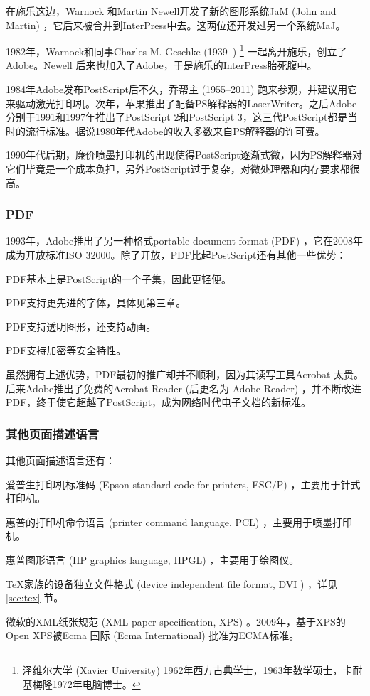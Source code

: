 在施乐这边，Warnock 和Martin Newell\indexNewell 开发了新的图形系统JaM (John and Martin) ，它后来被合并到InterPress中去。这两位还开发过另一个系统MaJ。

1982年，Warnock和同事Charles M. Geschke (1939--)\indexGeschke{} \footnote{泽维尔大学 (Xavier University) 1962年西方古典学士，1963年数学硕士，卡耐基梅隆1972年电脑博士。} 一起离开施乐，创立了Adobe\indexAdobe{}。Newell 后来也加入了Adobe，于是施乐的InterPress胎死腹中。

1984年Adobe发布PostScript后不久，乔帮主 (1955--2011)\indexJobs{} 跑来参观，并建议用它来驱动激光打印机。次年，苹果推出了配备PS解释器的LaserWriter。之后Adobe分别于1991和1997年推出了PostScript 2和PostScript 3，这三代PostScript都是当时的流行标准。据说1980年代Adobe的收入多数来自PS解释器的许可费。

1990年代后期，廉价喷墨打印机的出现使得PostScript逐渐式微，因为PS解释器对它们毕竟是一个成本负担，另外PostScript过于复杂，对微处理器和内存要求都很高。

\subsubsection{PDF}
1993年，Adobe推出了另一种格式portable document format (PDF) ，它在2008年成为开放标准ISO\indexISO{} 32000。除了开放，PDF比起PostScript还有其他一些优势：

\begin{compactitem}
   \item PDF基本上是PostScript的一个子集，因此更轻便。
   \item PDF支持更先进的字体，具体见第三章。
   \item PDF支持透明图形，还支持动画。
   \item PDF支持加密等安全特性。
\end{compactitem}

虽然拥有上述优势，PDF最初的推广却并不顺利，因为其读写工具Acrobat 太贵。后来Adobe推出了免费的Acrobat Reader (后更名为 Adobe Reader) ，并不断改进PDF，终于使它超越了PostScript，成为网络时代电子文档的新标准。

\subsubsection{其他页面描述语言}

其他页面描述语言还有：
\begin{compactitem}
   \item 爱普生\indexEpson{}打印机标准码 (Epson standard code for printers, ESC/P) ，主要用于针式打印机。
   \item 惠普\indexHP{}的打印机命令语言 (printer command language, PCL) ，主要用于喷墨打印机。
   \item 惠普图形语言 (HP graphics language, HPGL) ，主要用于绘图仪。
   \item \TeX 家族的设备独立文件格式 (device independent file format,  DVI ) ，详见 \ref{sec:tex} 节。
   \item 微软\indexMSFT 的XML纸张规范 (XML paper specification, XPS) 。2009年，基于XPS的Open XPS被Ecma 国际 (Ecma International)\indexECMA{} 批准为ECMA标准。
\end{compactitem}

